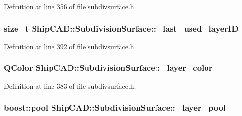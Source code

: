 Definition at line 356 of file subdivsurface.\-h.

\hypertarget{classShipCAD_1_1SubdivisionSurface_a0ba5c4e08110400890eb60140f3e2058}{
\subsubsection[{\-\_\-last\-\_\-used\-\_\-layer\-I\-D}]{\setlength{\rightskip}{0pt plus 5cm}size\-\_\-t Ship\-C\-A\-D\-::\-Subdivision\-Surface\-::\-\_\-last\-\_\-used\-\_\-layer\-I\-D\hspace{0.3cm}{\ttfamily [protected]}}}\label{classShipCAD_1_1SubdivisionSurface_a0ba5c4e08110400890eb60140f3e2058}


Definition at line 392 of file subdivsurface.\-h.

\hypertarget{classShipCAD_1_1SubdivisionSurface_a0833012e177dfd6cdb71174cb7baed17}{
\subsubsection[{\-\_\-layer\-\_\-color}]{\setlength{\rightskip}{0pt plus 5cm}Q\-Color Ship\-C\-A\-D\-::\-Subdivision\-Surface\-::\-\_\-layer\-\_\-color\hspace{0.3cm}{\ttfamily [protected]}}}\label{classShipCAD_1_1SubdivisionSurface_a0833012e177dfd6cdb71174cb7baed17}


Definition at line 383 of file subdivsurface.\-h.

\hypertarget{classShipCAD_1_1SubdivisionSurface_a953485df23e6f7393868b436384debef}{
\subsubsection[{\-\_\-layer\-\_\-pool}]{\setlength{\rightskip}{0pt plus 5cm}boost\-::pool Ship\-C\-A\-D\-::\-Subdivision\-Surface\-::\-\_\-layer\-\_\-pool\hspace{0.3cm}{\ttfamily [protected]}}}\label{classShipCAD_1_1SubdivisionSurface_a953485df23e6f7393868b436384debef}



